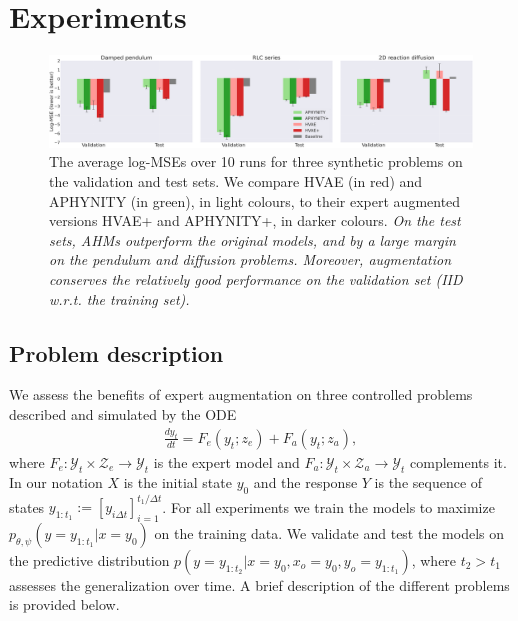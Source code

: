 \section{Experiments}
\begin{figure}
    \centering
    \includegraphics[width=.98\textwidth]{figures/chapter07/results_log_mse.png}
    \vspace{-1em}
    \caption{The average log-MSEs over 10 runs for three synthetic problems on the validation and test sets. We compare HVAE (in red) and APHYNITY (in green), in light colours, to their expert augmented versions HVAE+ and APHYNITY+, in darker colours. \textit{On the test sets, AHMs outperform the original models, and by a large margin on the pendulum and diffusion problems. Moreover, augmentation conserves the relatively good performance on the validation set (IID w.r.t. the training set).}}
    \label{fig:log_mse}
    \vspace{-1.em}
\end{figure}

\subsection{Problem description} \label{sec:problems_description}
We assess the benefits of expert augmentation on three controlled problems described and simulated by the ODE
\begin{align}
    \frac{dy_t}{dt} = F_e(y_t; z_e) + F_a(y_t; z_a), \label{eq:generic_ode}
\end{align}
where $F_e: \mathcal{Y}_t \times \mathcal{Z}_e \rightarrow \mathcal{Y}_t$ is the expert model and $F_a: \mathcal{Y}_t \times \mathcal{Z}_a \rightarrow \mathcal{Y}_t$ complements it. In our notation $X$ is the initial state $y_0$ and the response $Y$ is the sequence of states $y_{1:t_1}:=[y_{i\Delta t}]_{i=1}^{t_1 \!/\! \Delta t}$. For all experiments we train the models to maximize $p_{\theta, \psi}(y=y_{1:t_1}|x=y_0)$ on the training data. We validate and test the models on the predictive distribution $p(y=y_{1:t_2}|x=y_0, x_o=y_0, y_o=y_{1:t_1})$, where $t_2 > t_1$ assesses the generalization over time. A brief description of the different problems is provided below.

